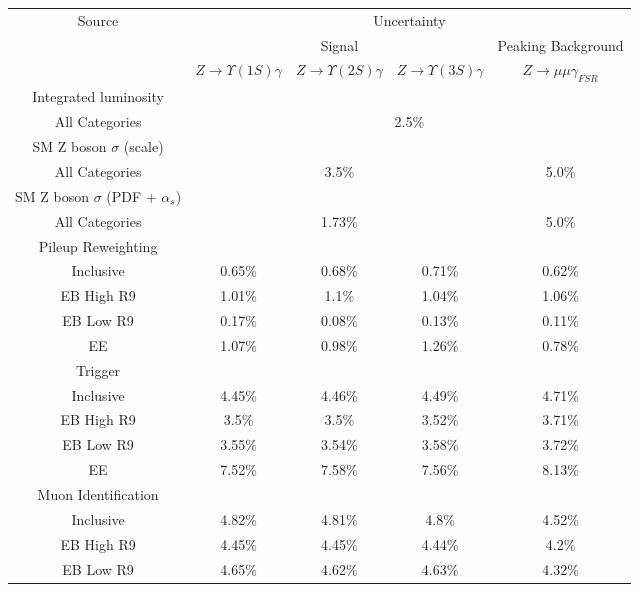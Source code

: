 
\begin{tabular}{c|c|c|c|c}
\cline{1-5}
\multirow{3}{*}{Source} & \multicolumn{4}{c}{Uncertainty} \\
\cline{2-5}
& \multicolumn{3}{c|}{Signal} & Peaking Background   \\
\cline{2-5}
& $Z \rightarrow \Upsilon(1S)  \gamma$ & $Z \rightarrow \Upsilon(2S)  \gamma$ & $Z \rightarrow \Upsilon(3S)  \gamma$ & $Z \rightarrow \mu\mu\gamma_{FSR}$  \\
\hline\hline
Integrated luminosity & \multicolumn{4}{l}{} \\ \hline
All Categories & \multicolumn{4}{c}{2.5\%} \\
\hline\hline
SM Z boson $\sigma$ (scale) & \multicolumn{4}{l}{} \\ \hline
All Categories & \multicolumn{3}{c|}{3.5\%}  & \multicolumn{1}{c}{5.0\%} \\
\hline\hline
SM Z boson $\sigma$ (PDF + $\alpha_s$)  & \multicolumn{4}{l}{} \\ \hline
All Categories & \multicolumn{3}{c|}{1.73\%}  & \multicolumn{1}{c}{5.0\%} \\
\hline\hline
Pileup Reweighting  & \multicolumn{4}{l}{} \\ \hline
Inclusive & 0.65\% & 0.68\% & 0.71\% & 0.62\% \\
EB High R9 & 1.01\% & 1.1\% & 1.04\% & 1.06\% \\
EB Low R9 & 0.17\% & 0.08\% & 0.13\% & 0.11\% \\
EE & 1.07\% & 0.98\% & 1.26\% & 0.78\% \\
\hline\hline
Trigger  & \multicolumn{4}{l}{} \\ \hline
Inclusive & 4.45\% & 4.46\% & 4.49\% & 4.71\% \\
EB High R9 & 3.5\% & 3.5\% & 3.52\% & 3.71\% \\
EB Low R9 & 3.55\% & 3.54\% & 3.58\% & 3.72\% \\
EE & 7.52\% & 7.58\% & 7.56\% & 8.13\% \\
\hline\hline
Muon Identification & \multicolumn{4}{l}{} \\ \hline
Inclusive & 4.82\% & 4.81\% & 4.8\% & 4.52\% \\
EB High R9 & 4.45\% & 4.45\% & 4.44\% & 4.2\% \\
EB Low R9 & 4.65\% & 4.62\% & 4.63\% & 4.32\% \\

\end{tabular}

